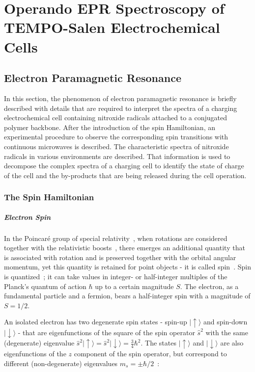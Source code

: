 \chapter{Operando EPR Spectroscopy of TEMPO-Salen Electrochemical Cells}

\section{Electron Paramagnetic Resonance}
In this section, the phenomenon of electron paramagnetic resonance is briefly described with details that are required to interpret the spectra of a charging electrochemical cell containing nitroxide radicals attached to a conjugated polymer backbone. After the introduction of the spin Hamiltonian, an experimental procedure to observe the corresponding spin transitions with continuous microwaves is described. The characteristic spectra of nitroxide radicals in various environments are described. That information is used to decompose the complex spectra of a charging cell to identify the state of charge of the cell and the by-products that are being released during the cell operation.

\subsection{The Spin Hamiltonian}
\paragraph*{Electron Spin}
In the Poincaré group of special relativity~\cite{poincare_1905}, when rotations are considered together with the relativistic boosts~\cite{einstein_s_rel}, there emerges an additional quantity that is associated with rotation and is preserved together with the orbital angular momentum, yet this quantity is retained for point objects - it is called spin~\cite{kuprov_2023}. Spin is quantized~\cite{SternGerlach1922}; it can take values in integer- or half-integer multiples of the Planck's quantum of action $\hbar$ up to a certain magnitude $S$. The electron, as a fundamental particle and a fermion, bears a half-integer spin with a magnitude of $S=1/2$. 

\par
An isolated electron has two degenerate spin states - spin-up $\vert{\uparrow}\rangle$ and spin-down $\vert{\downarrow}\rangle$ - that are eigenfunctions of the square of the spin operator $\hat{s}^2$ with the same (degenerate) eigenvalue $\hat{s}^2\vert{\uparrow}\rangle=\hat{s}^2\vert{\downarrow}\rangle=\frac{3}{4}\hbar^2$. The states $\vert{\uparrow}\rangle$ and $\vert{\downarrow}\rangle$ are also eigenfunctions of the $z$ component of the spin operator, but correspond to different (non-degenerate) eigenvalues $m_s=\pm\hbar/2$~\cite{Sakurai}: 

